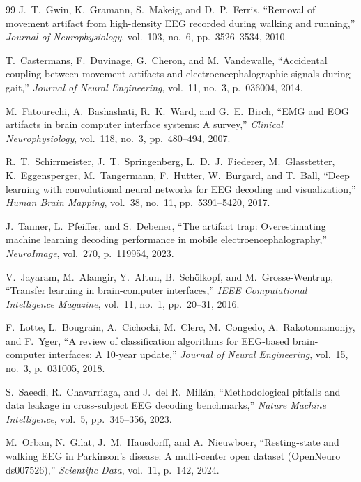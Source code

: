 \documentclass[11pt,a4paper]{article}
\begin{document}
\begin{thebibliography}{99}
J.~T.~Gwin, K.~Gramann, S.~Makeig, and D.~P.~Ferris, ``Removal of movement artifact from high-density EEG recorded during walking and running,'' \textit{Journal of Neurophysiology}, vol.~103, no.~6, pp.~3526--3534, 2010.

T.~Castermans, F.~Duvinage, G.~Cheron, and M.~Vandewalle, ``Accidental coupling between movement artifacts and electroencephalographic signals during gait,'' \textit{Journal of Neural Engineering}, vol.~11, no.~3, p.~036004, 2014.

M.~Fatourechi, A.~Bashashati, R.~K.~Ward, and G.~E.~Birch, ``EMG and EOG artifacts in brain computer interface systems: A survey,'' \textit{Clinical Neurophysiology}, vol.~118, no.~3, pp.~480--494, 2007.

R.~T.~Schirrmeister, J.~T.~Springenberg, L.~D.~J.~Fiederer, M.~Glasstetter, K.~Eggensperger, M.~Tangermann, F.~Hutter, W.~Burgard, and T.~Ball, ``Deep learning with convolutional neural networks for EEG decoding and visualization,'' \textit{Human Brain Mapping}, vol.~38, no.~11, pp.~5391--5420, 2017.

J.~Tanner, L.~Pfeiffer, and S.~Debener, ``The artifact trap: Overestimating machine learning decoding performance in mobile electroencephalography,'' \textit{NeuroImage}, vol.~270, p.~119954, 2023.

V.~Jayaram, M.~Alamgir, Y.~Altun, B.~Sch\"{o}lkopf, and M.~Grosse-Wentrup, ``Transfer learning in brain-computer interfaces,'' \textit{IEEE Computational Intelligence Magazine}, vol.~11, no.~1, pp.~20--31, 2016.

F.~Lotte, L.~Bougrain, A.~Cichocki, M.~Clerc, M.~Congedo, A.~Rakotomamonjy, and F.~Yger, ``A review of classification algorithms for EEG-based brain-computer interfaces: A 10-year update,'' \textit{Journal of Neural Engineering}, vol.~15, no.~3, p.~031005, 2018.

S.~Saeedi, R.~Chavarriaga, and J.~del R.~Mill\'{a}n, ``Methodological pitfalls and data leakage in cross-subject EEG decoding benchmarks,'' \textit{Nature Machine Intelligence}, vol.~5, pp.~345--356, 2023.

M.~Orban, N.~Gilat, J.~M.~Hausdorff, and A.~Nieuwboer, ``Resting-state and walking EEG in Parkinson's disease: A multi-center open dataset (OpenNeuro ds007526),'' \textit{Scientific Data}, vol.~11, p.~142, 2024.


\end{thebibliography}
\end{document}
